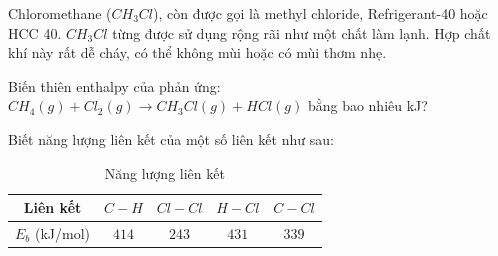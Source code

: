 \documentclass[Main.tex]{subfiles}
\begin{document}
\begin{bt}
	Chloromethane ($CH_3Cl$), còn được gọi là methyl chloride, Refrigerant-40 hoặc HCC 40. $CH_3Cl$ từng được sử dụng rộng rãi như một chất làm lạnh. Hợp chất khí này rất dễ cháy, có thể không mùi hoặc có mùi thơm nhẹ.
	
	Biến thiên enthalpy của phản ứng: $CH_4(g) + Cl_2(g) \longrightarrow CH_3Cl(g) + HCl(g)$ bằng bao nhiêu kJ?
	
	Biết năng lượng liên kết của một số liên kết như sau:
	\begin{table}[h]
		\centering
		\begin{tabular}{|c|c|c|c|c|}
			\hline
			Liên kết & $C-H$ & $Cl-Cl$ & $H-Cl$ & $C-Cl$ \\
			\hline
			$E_b$ (kJ/mol) & $414$ & $243$ & $431$ & $339$ \\
			\hline
		\end{tabular}
		\caption{Năng lượng liên kết}
		\label{bang_nang_luong_lien_ket_22}
	\end{table}
\end{bt}
\end{document}
